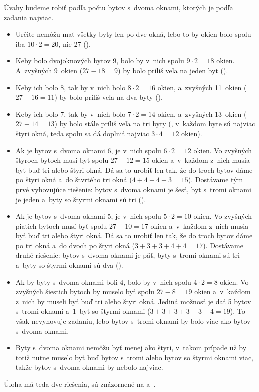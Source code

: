 {%
Úvahy budeme robiť podľa počtu bytov s~dvoma oknami, ktorých je podľa zadania najviac.
\begin{itemize}
  \item Určite nemôžu mať všetky byty len po dve okná, lebo to by okien bolo spolu iba $10\cdot2=20$, nie 27 (\obr).
  \item Keby bolo dvojoknových bytov 9, bolo by v~nich spolu $9\cdot2=18$ okien. A~zvyšných 9~okien ($27-18=9$) by bolo príliš veľa na jeden byt (\obr).
  \item Keby ich bolo 8, tak by v~nich bolo $8\cdot2=16$ okien, a~zvyšných 11~okien (${27-16}=11$) by bolo príliš veľa na dva byty (\obr).
  \item Keby ich bolo 7, tak by v~nich bolo $7\cdot2=14$ okien, a~zvyšných 13~okien (${27-14}=13$) by bolo stále príliš veľa na tri byty (\obr, v~každom byte sú najviac štyri okná, teda spolu sa dá doplniť najviac $3\cdot4=12$ okien).
  \item Ak je bytov s~dvoma oknami 6, je v~nich spolu $6\cdot2=12$ okien. Vo zvyšných štyroch bytoch musí byť spolu $27-12=15$ okien a~v~každom z~nich musia byť buď tri alebo štyri okná. Dá sa to urobiť len tak, že do troch bytov dáme po štyri okná a~do štvrtého tri okná ($4+4+4+3=15$). Dostávame tým prvé vyhovujúce riešenie: bytov s~dvoma oknami je šesť, byt s~tromi oknami je jeden a~byty so štyrmi oknami sú tri (\obr).
  \item Ak je bytov s~dvoma oknami 5, je v~nich spolu $5\cdot2=10$ okien. Vo zvyšných piatich bytoch musí byť spolu $27-10=17$ okien a~v~každom z~nich musia byť buď tri alebo štyri okná. Dá sa to urobiť len tak, že do troch bytov dáme po tri okná a~do dvoch po štyri okná ($3+3+3+4+4=17$). Dostávame druhé riešenie: bytov s~dvoma oknami je päť, byty s~tromi oknami sú tri a~byty so štyrmi oknami sú dva (\obr).
  \item Ak by byty s~dvoma oknami boli 4, bolo by v~nich spolu $4\cdot2=8$ okien. Vo zvyšných šiestich bytoch by muselo byť spolu $27-8=19$ okien a~v~každom z~nich by museli byť buď tri alebo štyri okná. Jediná možnosť je dať 5 bytov s~tromi oknami a~1~byt so štyrmi oknami ($3+3+3+3+3+4=19$). To však nevyhovuje zadaniu, lebo bytov s~tromi oknami by bolo viac ako bytov s~dvoma oknami.
  \item Byty s~dvoma oknami nemôžu byť menej ako štyri, v~takom prípade už by totiž nutne muselo byť buď bytov s~tromi alebo bytov so štyrmi oknami viac, takže bytov s~dvoma oknami by nebolo najviac.
\end{itemize}
Úloha má teda dve riešenia, sú znázornené na  a~.

}
